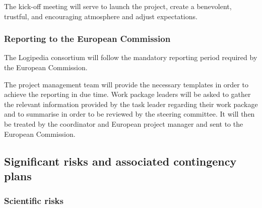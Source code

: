 The kick-off meeting will serve to launch the project, create a
benevolent, trustful, and encouraging atmosphere and adjust
expectations.

\subsubsection*{Reporting to the European Commission}

The Logipedia consortium will follow the mandatory reporting period
required by the European Commission. 

The project management team will provide the necessary templates in
order to achieve the reporting in due time. Work package leaders will
be asked to gather the relevant information provided by the task
leader regarding their work package and to summarise in order to be
reviewed by the steering committee. It will then be treated by the
coordinator and European project manager and sent to the
European Commission.

\subsection*{Significant risks and associated contingency plans}
\label{sec:risks}

\subsubsection*{Scientific risks}

